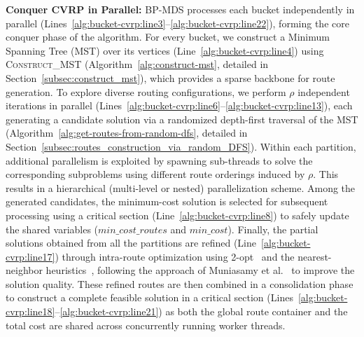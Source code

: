 \textbf{Conquer CVRP in Parallel:} BP-MDS processes each bucket independently in parallel (Lines~\ref{alg:bucket-cvrp:line3}--\ref{alg:bucket-cvrp:line22}), forming the core conquer phase of the algorithm. For every bucket, we construct a Minimum Spanning Tree (MST) over its vertices (Line~\ref{alg:bucket-cvrp:line4}) using \textsc{Construct\_MST} (Algorithm~\ref{alg:construct-mst}, detailed in Section~\ref{subsec:construct_mst}), which provides a sparse backbone for route generation. To explore diverse routing configurations, we perform $\rho$ independent iterations in parallel (Lines~\ref{alg:bucket-cvrp:line6}--\ref{alg:bucket-cvrp:line13}), each generating a candidate solution via a randomized depth-first traversal of the MST (Algorithm~\ref{alg:get-routes-from-random-dfs}, detailed in Section~\ref{subsec:routes_construction_via_random_DFS}). Within each partition, additional parallelism is exploited by spawning sub-threads to solve the corresponding subproblems using different route orderings induced by $\rho$. This results in a hierarchical (multi-level or nested) parallelization scheme. Among the generated candidates, the minimum-cost solution is selected for subsequent processing using a critical section (Line~\ref{alg:bucket-cvrp:line8}) to safely update the shared variables ($min\_cost\_routes$ and $min\_cost$).
Finally, the partial solutions obtained from all the partitions are refined (Line~\ref{alg:bucket-cvrp:line17}) through intra-route optimization using 2-opt~\cite{Croes_1958, Flood_1956} and the nearest-neighbor heuristics~\cite{Rosenkrantz_1977}, following the approach of Muniasamy et al.~\cite{Muniasamy_VRP} to improve the solution quality. These refined routes are then combined in a consolidation phase to construct a complete feasible solution in a critical section (Lines~\ref{alg:bucket-cvrp:line18}--\ref{alg:bucket-cvrp:line21}) %
as both the global route container and the total cost are shared across concurrently running worker threads. 













